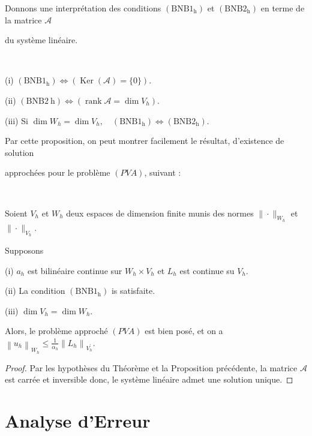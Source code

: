 Donnons une interprétation des conditions $\left(\mathrm{BNB} 1_{\mathrm{h}}\right)$  et  $\left(\mathrm{BNB} 2_{\mathrm{h}}\right)$ en terme de la matrice $\mathcal{A}$ 

du système linéaire.

\begin{proposition}\
	
	(i) $\left(\mathrm{BNB} 1_{\mathrm{h}}\right) \Longleftrightarrow(\operatorname{Ker}(\mathcal{A})=\{0\})$.
	
(ii) $(\mathrm{BNB} 2 \mathrm{~h}) \Longleftrightarrow\left(\operatorname{rank} \mathcal{A}=\operatorname{dim} V_{h}\right)$.

(iii) Si $\operatorname{dim} W_{h}=\operatorname{dim} V_{h},\quad \left(\mathrm{BNB} 1_{\mathrm{h}}\right) \Longleftrightarrow\left(\mathrm{BNB} 2_{\mathrm{h}}\right)$.

\end{proposition}

Par cette proposition, on peut montrer facilement le résultat,  d'existence de solution 

approchées pour le problème $(PVA)$, suivant :

\begin{theorem}\
	
Soient $V_{h}$ et  $W_{h}$  deux espaces de dimension finite munis des normes $\|\cdot\|_{W_{h}}$  et  $\|\cdot\|_{V_{h}}$.  

Supposons 

(i) $a_{h}$ est  bilinéaire continue  sur  $W_{h} \times V_{h}$ et  $L_{h}$ est  continue su  $V_{h}$.

(ii) La condition $\left(\mathrm{BNB} 1_{\mathrm{h}}\right)$ is satisfaite.

(iii) $\dim V_{h}=\dim W_{h}$.

Alors,  le problème approché $(PVA)$ est bien posé, et on a  $\left\|u_{h}\right\|_{W_{h}} \leq \frac{1}{\alpha_{h}}\left\|L_{h}\right\|_{V_{h}^{\prime}}$.
\end{theorem}

\begin{proof}
Par les hypothèses du Théorème et la Proposition précédente, la matrice $\mathcal{A}$ est carrée et inversible donc, le système linéaire admet une solution unique.
\end{proof}
\section{Analyse d'Erreur}

